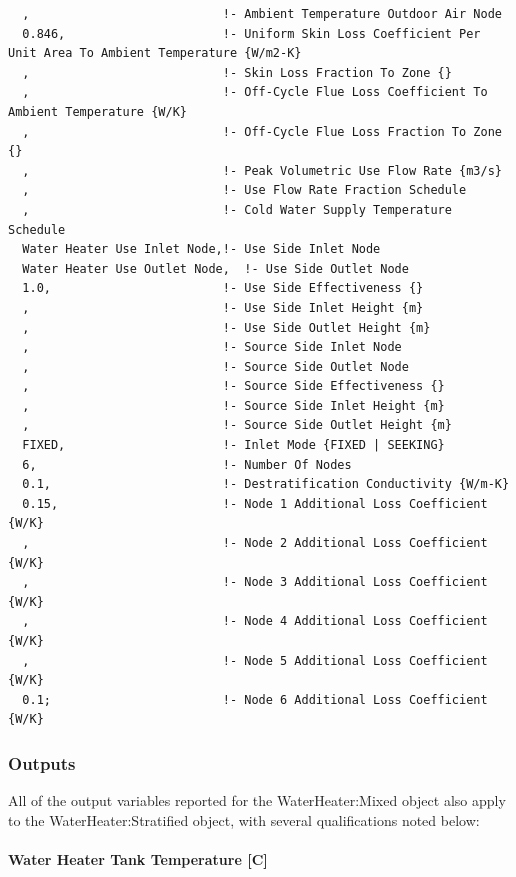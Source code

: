 \begin{lstlisting}
  ,                           !- Ambient Temperature Outdoor Air Node
  0.846,                      !- Uniform Skin Loss Coefficient Per Unit Area To Ambient Temperature {W/m2-K}
  ,                           !- Skin Loss Fraction To Zone {}
  ,                           !- Off-Cycle Flue Loss Coefficient To Ambient Temperature {W/K}
  ,                           !- Off-Cycle Flue Loss Fraction To Zone {}
  ,                           !- Peak Volumetric Use Flow Rate {m3/s}
  ,                           !- Use Flow Rate Fraction Schedule
  ,                           !- Cold Water Supply Temperature Schedule
  Water Heater Use Inlet Node,!- Use Side Inlet Node
  Water Heater Use Outlet Node,  !- Use Side Outlet Node
  1.0,                        !- Use Side Effectiveness {}
  ,                           !- Use Side Inlet Height {m}
  ,                           !- Use Side Outlet Height {m}
  ,                           !- Source Side Inlet Node
  ,                           !- Source Side Outlet Node
  ,                           !- Source Side Effectiveness {}
  ,                           !- Source Side Inlet Height {m}
  ,                           !- Source Side Outlet Height {m}
  FIXED,                      !- Inlet Mode {FIXED | SEEKING}
  6,                          !- Number Of Nodes
  0.1,                        !- Destratification Conductivity {W/m-K}
  0.15,                       !- Node 1 Additional Loss Coefficient {W/K}
  ,                           !- Node 2 Additional Loss Coefficient {W/K}
  ,                           !- Node 3 Additional Loss Coefficient {W/K}
  ,                           !- Node 4 Additional Loss Coefficient {W/K}
  ,                           !- Node 5 Additional Loss Coefficient {W/K}
  0.1;                        !- Node 6 Additional Loss Coefficient {W/K}
\end{lstlisting}

\subsubsection{Outputs}\label{outputs-1-030}

All of the output variables reported for the WaterHeater:Mixed object also apply to the WaterHeater:Stratified object, with several qualifications noted below:

\paragraph{Water Heater Tank Temperature {[}C{]}}\label{water-heater-tank-temperature-c-1}

